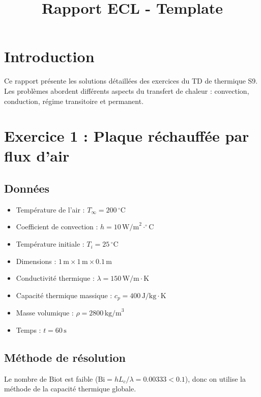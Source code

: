 \documentclass{rapportECL}
\title{Rapport ECL - Template} %
\begin{document}


        
\fairemarges %
\fairepagedegarde %
\tabledematieres %


\section*{Introduction}
Ce rapport présente les solutions détaillées des exercices du TD de thermique S9. Les problèmes abordent différents aspects du transfert de chaleur : convection, conduction, régime transitoire et permanent.

\section{Exercice 1 : Plaque réchauffée par flux d'air}

\subsection*{Données}
\begin{itemize}
    \item Température de l'air : \( T_{\infty} = 200 \, ^\circ \text{C} \)
    \item Coefficient de convection : \( h = 10 \, \text{W/m}^2 \cdot ^\circ \text{C} \)
    \item Température initiale : \( T_i = 25 \, ^\circ \text{C} \)
    \item Dimensions : \( 1 \, \text{m} \times 1 \, \text{m} \times 0.1 \, \text{m} \)
    \item Conductivité thermique : \( \lambda = 150 \, \text{W/m} \cdot \text{K} \)
    \item Capacité thermique massique : \( c_p = 400 \, \text{J/kg} \cdot \text{K} \)
    \item Masse volumique : \( \rho = 2800 \, \text{kg/m}^3 \)
    \item Temps : \( t = 60 \, \text{s} \)
\end{itemize}

\subsection*{Méthode de résolution}
Le nombre de Biot est faible (\( \text{Bi} = h L_c / \lambda = 0.00333 < 0.1 \)), donc on utilise la méthode de la capacité thermique globale.
\end{document}

